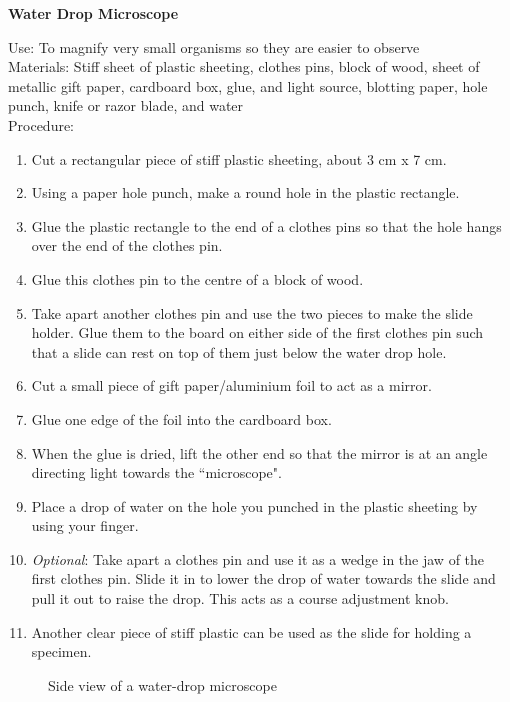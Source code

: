 \begin{flushleft}
\textbf{Water Drop Microscope}
\end{flushleft}
\vspace{-10pt}
Use: To magnify very small organisms so they are easier to observe\\
Materials: Stiff sheet of plastic sheeting, clothes pins, block of wood, sheet of metallic gift paper, cardboard box, glue, and light source, blotting paper, hole punch, knife or razor blade, and water\\
Procedure: 
\begin{enumerate} 
\item Cut a rectangular piece of stiff plastic sheeting, about 3 cm x 7 cm.
\item Using a paper hole punch, make a round hole in the plastic rectangle. 
\item Glue the plastic rectangle to the end of a clothes pins so that the hole hangs over the end of the clothes pin.
\item Glue this clothes pin to the centre of a block of wood.
\item Take apart another clothes pin and use the two pieces to make the slide holder. Glue them to the board on either side of the first clothes pin such that a slide can rest on top of them just below the water drop hole.
\item Cut a small piece of gift paper/aluminium foil to act as a mirror.
\item Glue one edge of the foil into the cardboard box.
\item When the glue is dried, lift the other end so that the mirror is at an angle directing light towards the ``microscope".
\item Place a drop of water on the hole you punched in the plastic sheeting by using your finger.
\item \textit{Optional}: Take apart a clothes pin and use it as a wedge in the jaw of the first clothes pin. Slide it in to lower the drop of water towards the slide and pull it out to raise the drop. This acts as a course adjustment knob.
\item Another clear piece of stiff plastic can be used as the slide for holding a specimen.
\end{enumerate}

\begin{figure}[b]
\begin{center}
\def\svgwidth{350pt}

\caption{Side view of a water-drop microscope}
\label{fig:microscope-side}
\end{center}
\end{figure}

